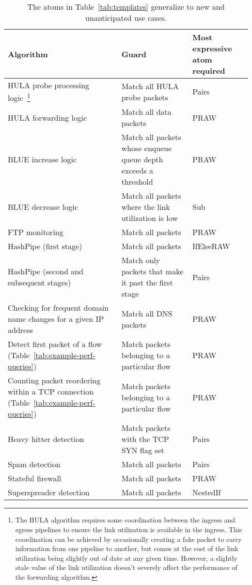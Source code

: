 \begin{savenotes}
\begin{table*}[!t]
\centering
\begin{small}
  \begin{tabular}{|p{}|p{} | p{}|}
\hline
Algorithm & Guard & Most expressive atom required\\
\hline
HULA probe processing logic~\cite{hula}\footnote{The HULA algorithm requires
some coordination between the ingress and egress pipelines to ensure the link
utilization is available in the ingress. This coordination can be achieved by
occasionally creating a fake packet to carry information from one pipeline to
another, but comes at the cost of the link utilization being slightly out of
date at any given time. However, a slightly stale value of the link utilization
doesn't severely affect the performance of the forwarding algorithm.} & Match
all HULA probe packets & Pairs \\
\hline
HULA forwarding logic~\cite{hula} & Match all data packets & PRAW \\
\hline
BLUE increase logic~\cite{blue} & Match all packets whose enqueue queue depth exceeds a threshold & PRAW \\
\hline
BLUE decrease logic~\cite{blue} & Match all packets where the link utilization is low & Sub \\
\hline
FTP monitoring~\cite{snap} & Match all packets & PRAW \\
\hline
HashPipe (first stage)~\cite{hashpipe} & Match all packets & IfElseRAW \\
\hline
HashPipe (second and subsequent stages)~\cite{hashpipe} & Match only packets that make it past the first stage & Pairs\\
\hline
Checking for frequent domain name changes for a given IP address~\cite{snap} & Match all DNS packets & PRAW \\
\hline
Detect first packet of a flow (Table~\ref{tab:example-perf-queries}) & Match packets belonging to a particular flow & PRAW \\
\hline
Counting packet reordering within a TCP connection (Table~\ref{tab:example-perf-queries}) & Match packets belonging to a particular flow & PRAW \\
\hline
Heavy hitter detection~\cite{snap} & Match packets with the TCP SYN flag set & Pairs \\
\hline
Spam detection~\cite{snap} & Match all packets & Pairs \\
\hline
Stateful firewall~\cite{snap} & Match all packets & PRAW \\
\hline
Superspreader detection~\cite{snap} & Match all packets & NestedIf \\
\hline
\end{tabular}
\caption{The atoms in Table~\ref{tab:templates} generalize to new and unanticipated use cases.}
\label{tab:atoms_generalize}
\end{small}
\end{table*}
\end{savenotes}
